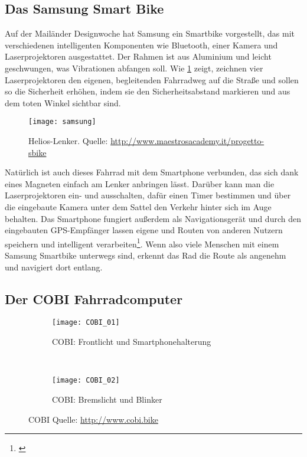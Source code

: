 \subsection{Das Samsung Smart Bike}
Auf der Mailänder Designwoche hat Samsung ein Smartbike vorgestellt, das mit verschiedenen intelligenten Komponenten wie Bluetooth, einer Kamera und Laserprojektoren ausgestattet. Der Rahmen ist aus Aluminium und leicht geschwungen, was Vibrationen abfangen soll. Wie \ref{fig:samsung} zeigt, zeichnen vier Laserprojektoren den eigenen, begleitenden Fahrradweg auf die Straße und sollen so die Sicherheit erhöhen, indem sie den Sicherheitsabstand markieren und aus dem toten Winkel sichtbar sind. 
\begin{figure}[H]
    \centering
    \texttt{[image: samsung]}
    \caption[Samsung Smart Bike]{Helios-Lenker.  Quelle: \url{http://www.maestrosacademy.it/progetto-sbike}} \label{fig:samsung}
\end{figure}
Natürlich ist auch dieses Fahrrad mit dem Smartphone verbunden, das sich dank eines Magneten einfach am Lenker anbringen lässt. Darüber kann man die Laserprojektoren ein- und ausschalten, dafür einen Timer bestimmen und über die eingebaute Kamera unter dem Sattel den Verkehr hinter sich im Auge behalten. Das Smartphone fungiert außerdem als Navigationsgerät und durch den eingebauten \gls{GPS}-Empfänger lassen eigene und Routen von anderen Nutzern speichern und intelligent verarbeiten\footnote{\cite{smartbike}}. Wenn also viele Menschen mit einem Samsung Smartbike unterwegs sind, erkennt das Rad die Route als angenehm und navigiert dort entlang. 
\subsection{Der COBI Fahrradcomputer}
\begin{figure}
        \centering
        \begin{subfigure}[b]{0.5\textwidth}
                \texttt{[image: COBI\_01]}
                \caption{COBI: Frontlicht und Smartphonehalterung}
                \label{fig:cobi1}
        \end{subfigure}%
        ~ %
        \begin{subfigure}[b]{0.5\textwidth}
                \texttt{[image: COBI\_02]}
                \caption{COBI: Bremslicht und Blinker}
                \label{fig:cobi}
        \end{subfigure}
        \caption{COBI Quelle: \url{http://www.cobi.bike}}\label{fig:cobi}
\end{figure}
